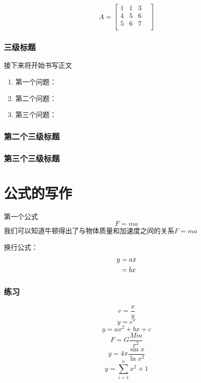 \documentclass[UTF8]{ctexart}
\begin{document}
\begin{equation}
	A=\begin{bmatrix}
		1 & 1 & 3 \\4&5&6\\5&6&7&\\
	\end{bmatrix}
\end{equation}
\subsubsection{三级标题}

接下来将开始书写正文
\begin{enumerate}
	\item 第一个问题：
	\item 第二个问题：
	\item 第三个问题：
\end{enumerate}

\subsubsection{第二个三级标题}


\subsubsection{第三个三级标题}

\section{公式的写作}
第一个公式
\begin{equation}
	F=ma
\end{equation}
我们可以知道牛顿得出了与物体质量和加速度之间的关系$F=ma$

换行公式：
\begin{align}
	y & =ax\notag \\
	  & =bx
\end{align}

\subsubsection{练习}
\begin{equation}
	v=\frac{x}{y}
\end{equation}
\begin{equation}
	y=e^{x}
\end{equation}
\begin{equation}
	y=ax^2+bx+c
\end{equation}
\begin{equation}
	F=G\frac{Mm}{r^2}
\end{equation}
\begin{equation}
	y=4\pi \frac{\sin{x}}{\ln{x^2}}
\end{equation}
\begin{equation}
	\label{eq:ceshi}
	y=\sum^{n}_{i=1} x^2+1
\end{equation}
\end{document}
